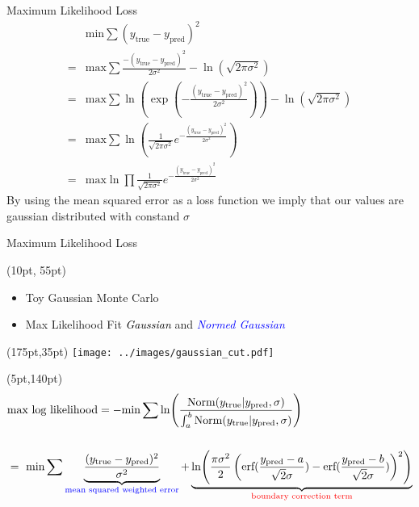 \documentclass[10pt]{beamer}
\begin{document}
\begin{frame}{Maximum Likelihood Loss}
  \begin{align*}
    &\text{min} \sum (y_{\text{true}}-y_{\text{pred}})^2 \\
    =&\text{max} \sum\frac{-(y_{\text{true}}-y_{\text{pred}})^2}{2 \sigma^2} - \ln(\sqrt{2\pi \sigma^2}) \\
    = &\text{max} \sum \ln(\exp(-\frac{(y_{\text{true}}-y_{\text{pred}})^2}{2 \sigma^2})) - \ln(\sqrt{2\pi \sigma^2}) \\
    = &\text{max} \sum \ln( \frac{1}{\sqrt{2\pi \sigma^2}} e^{-\frac{(y_{\text{true}}-y_{\text{pred}})^2}{2 \sigma^2}}) \\
    = &\text{max} \ln \prod \frac{1}{\sqrt{2\pi \sigma^2}} e^{-\frac{(y_{\text{true}}-y_{\text{pred}})^2}{2 \sigma^2}}
  \end{align*}
    By using the mean squared error as a loss function we imply that our values are gaussian distributed with constand $\sigma$
\end{frame}

\begin{frame}{Maximum Likelihood Loss}

  \begin{textblock*}{150pt}(10pt, 55pt)
    \begin{itemize}
    \item Toy Gaussian Monte Carlo
    \item Max Likelihood Fit \emph{\textcolor{black}{Gaussian}} and \emph{\textcolor{blue}{Normed Gaussian}}
    \end{itemize}
  \end{textblock*}

  
  \begin{textblock*}{150pt}(175pt,35pt)
      \texttt{[image: ../images/gaussian\_cut.pdf]}
  \end{textblock*}

  \begin{textblock*}{150pt}(5pt,140pt)
    \begin{align*}
      &\text{max log likelihood} = -\text{min} \sum \ln(\frac{\text{Norm}(y_{\text{true}} | y_{\text{pred}}, \sigma)}{\int^b_a \text{Norm}(y_{\text{true}} | y_{\text{pred}}, \sigma)})\\ \\
                                            &=\ \text{min} \sum \underbrace{\frac{(y_{\text{true}}-y_{\text{pred}})^2}{\sigma^2}}_{\text{\textcolor{blue}{mean squared weighted error}}} +\underbrace{\ln(\frac{\pi \sigma^2}{2} \left(\text{erf}(\frac{y_{\text{pred}}-a}{\sqrt{2}\sigma}) - \text{erf}(\frac{y_{\text{pred}}-b}{\sqrt{2}\sigma})\right)^2)}_{\text{\textcolor{red}{boundary correction term}}}
    \end{align*}
  \end{textblock*}

\end{frame}
\end{document}
